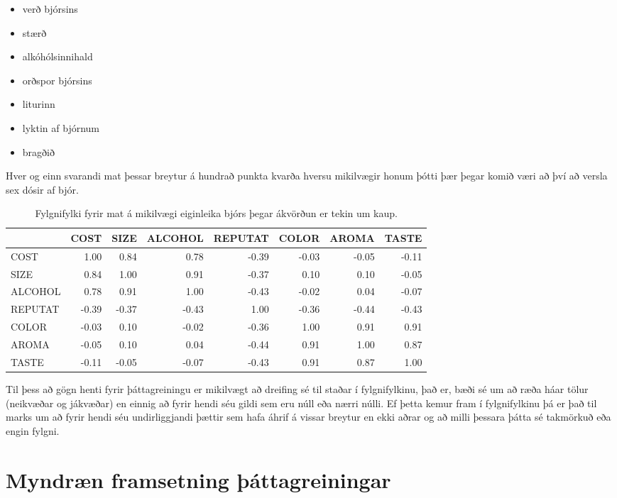 \documentclass[]{book}
\providecommand{\tightlist}{%
  \setlength{\itemsep}{0pt}\setlength{\parskip}{0pt}}
\begin{document}
\begin{itemize}
\tightlist
\item
  verð bjórsins
\item
  stærð
\item
  alkóhólsinnihald
\item
  orðspor bjórsins
\item
  liturinn
\item
  lyktin af bjórnum
\item
  bragðið
\end{itemize}

Hver og einn svarandi mat þessar breytur á hundrað punkta kvarða hversu mikilvægir honum þótti þær þegar komið væri að því að versla sex dósir af bjór.

\begin{table}

\caption{\label{tab:fylgnifylki}Fylgnifylki fyrir mat á mikilvægi eiginleika bjórs þegar ákvörðun er tekin um kaup.}
\centering
\begin{tabular}[t]{l|r|r|r|r|r|r|r}
\hline
  & COST & SIZE & ALCOHOL & REPUTAT & COLOR & AROMA & TASTE\\
\hline
COST & 1.00 & 0.84 & 0.78 & -0.39 & -0.03 & -0.05 & -0.11\\
\hline
SIZE & 0.84 & 1.00 & 0.91 & -0.37 & 0.10 & 0.10 & -0.05\\
\hline
ALCOHOL & 0.78 & 0.91 & 1.00 & -0.43 & -0.02 & 0.04 & -0.07\\
\hline
REPUTAT & -0.39 & -0.37 & -0.43 & 1.00 & -0.36 & -0.44 & -0.43\\
\hline
COLOR & -0.03 & 0.10 & -0.02 & -0.36 & 1.00 & 0.91 & 0.91\\
\hline
AROMA & -0.05 & 0.10 & 0.04 & -0.44 & 0.91 & 1.00 & 0.87\\
\hline
TASTE & -0.11 & -0.05 & -0.07 & -0.43 & 0.91 & 0.87 & 1.00\\
\hline
\end{tabular}
\end{table}

Til þess að gögn henti fyrir þáttagreiningu er mikilvægt að dreifing sé til staðar í fylgnifylkinu, það er, bæði sé um að ræða háar tölur (neikvæðar og jákvæðar) en einnig að fyrir hendi séu gildi sem eru núll eða nærri núlli. Ef þetta kemur fram í fylgnifylkinu þá er það til marks um að fyrir hendi séu undirliggjandi þættir sem hafa áhrif á vissar breytur en ekki aðrar og að milli þessara þátta sé takmörkuð eða engin fylgni.

\hypertarget{myndruxe6n-framsetning-uxfeuxe1ttagreiningar}{%
\section{Myndræn framsetning þáttagreiningar}\label{myndruxe6n-framsetning-uxfeuxe1ttagreiningar}}
\end{document}
